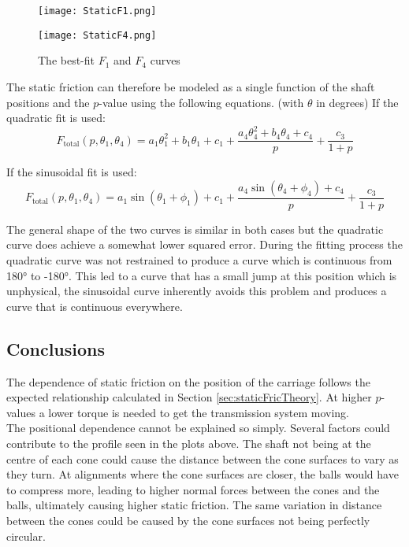 \documentclass[12pt]{article}
\begin{document}
\begin{figure}[!h]
    \centering
    \begin{minipage}{0.49\textwidth}       
         \texttt{[image: StaticF1.png]}
    \end{minipage}
    \begin{minipage}{0.49\textwidth}       
         \texttt{[image: StaticF4.png]}
    \end{minipage}




\label{fig:staticFitCurves}
\caption{The best-fit $F_1$ and $F_4$ curves}

\end{figure}

The static friction can therefore be modeled as a single function of the shaft positions and the $p$-value using the following equations. (with $\theta$ in degrees)
If the quadratic fit is used:\\

$$F_{\text{total}} (p, \theta_1, \theta_4) = a_1 \theta_1^2 + b_1 \theta_1 + c_1 + \frac{ a_4 \theta_4^2 + b_4 \theta_4 + c_4 }{p} + \frac{c_3}{1+p}$$

If the sinusoidal fit is used:\\
$$F_{\text{total}} (p, \theta_1, \theta_4)= a_1 \sin\left( \theta_1 + \phi_1  \right)  + c_1 + \frac{a_4 \sin\left( \theta_4 + \phi_4  \right)  + c_4}{p} + \frac{c_3}{1+p}$$

The general shape of the two curves is similar in both cases but the quadratic curve does achieve a somewhat lower squared error. During the fitting process the quadratic curve was not restrained to produce a curve which is continuous from 180° to -180°. This led to a curve that has a small jump at this position which is unphysical, the sinusoidal curve inherently avoids this problem and produces a curve that is continuous everywhere.

 
\subsection{Conclusions}
The dependence of static friction on the position of the carriage follows the expected relationship calculated in Section \ref{sec:staticFricTheory}. At higher $p$-values a lower torque is needed to get the transmission system moving. \\

The positional dependence cannot be explained so simply. Several factors could contribute to the profile seen in the plots above. The shaft not being at the centre of each cone could cause the distance between the cone surfaces to vary as they turn. At alignments where the cone surfaces are closer, the balls would have to compress more, leading to higher normal forces between the cones and the balls, ultimately causing higher static friction. The same variation in distance between the cones could be caused by the cone surfaces not being perfectly circular.\\
\end{document}
